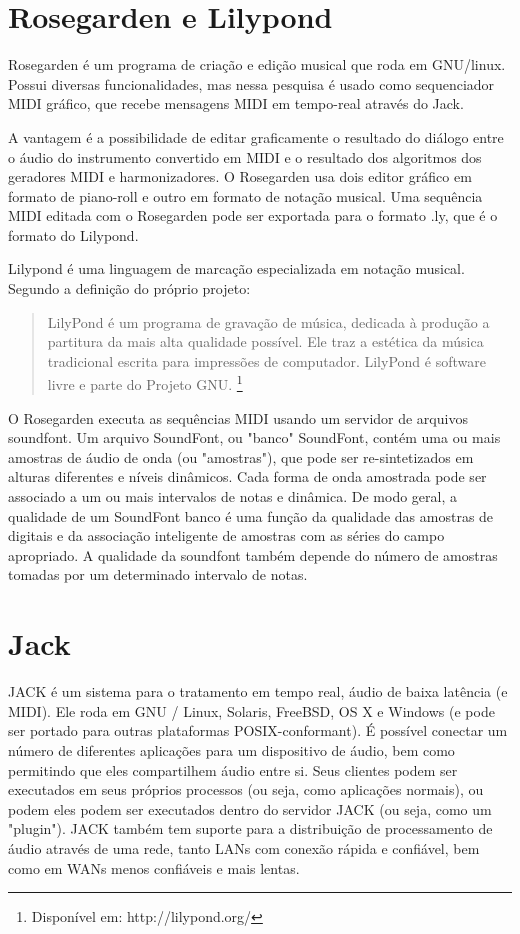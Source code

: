 \documentclass{ppgmus}
\begin{document}
\section{Rosegarden e Lilypond}

Rosegarden é um programa de criação e edição musical que roda em GNU/linux.
Possui diversas funcionalidades, mas nessa pesquisa é usado como sequenciador
MIDI gráfico, que recebe mensagens MIDI em tempo-real através do Jack.

A vantagem é a possibilidade de editar graficamente o resultado do diálogo entre
o áudio do instrumento convertido em MIDI e o resultado dos algoritmos dos geradores
MIDI e harmonizadores. O Rosegarden usa dois editor gráfico em formato de piano-roll
e outro em formato de notação musical. Uma sequência MIDI editada com o Rosegarden
pode ser exportada para o formato .ly, que é o formato do Lilypond.

Lilypond é uma linguagem de marcação especializada em notação musical. Segundo
a definição do próprio projeto:

\begin{quote}
 LilyPond é um programa de gravação de música, dedicada à produção a partitura da mais alta qualidade possível. 
Ele traz a estética da música tradicional escrita para impressões de computador. LilyPond é software livre e 
parte do Projeto GNU. \footnote{Disponível em: http://lilypond.org/}
\end{quote} 

O Rosegarden executa as sequências MIDI usando um servidor de arquivos soundfont.
Um arquivo SoundFont, ou "banco" SoundFont, contém uma ou mais amostras de áudio de onda (ou "amostras"),
que pode ser re-sintetizados em alturas diferentes e níveis dinâmicos. Cada forma de onda amostrada pode ser
associado a um ou mais intervalos de notas e dinâmica. De modo geral, a qualidade de um
SoundFont banco é uma função da qualidade das amostras de digitais e da associação inteligente
de amostras com as séries do campo apropriado. A qualidade da soundfont também depende do número de amostras
tomadas por um determinado intervalo de notas. 

\section{Jack}


JACK é um sistema para o tratamento em tempo real, áudio de baixa latência (e MIDI). 
Ele roda em GNU / Linux, Solaris, FreeBSD, OS X e Windows (e pode ser portado para outras plataformas 
POSIX-conformant). É possível conectar um número de diferentes aplicações para um dispositivo de áudio, 
bem como permitindo que eles compartilhem áudio entre si. Seus clientes podem ser executados em seus próprios 
processos (ou seja, como aplicações normais), ou podem eles podem ser executados dentro do servidor JACK 
(ou seja, como um "plugin"). JACK também tem suporte para a distribuição de processamento de áudio através de 
uma rede, tanto LANs com conexão rápida e confiável, bem como em WANs menos confiáveis e mais lentas.
\end{document}
